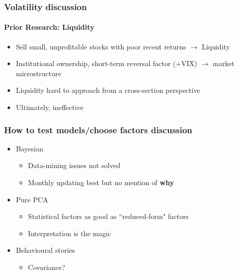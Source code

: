\documentclass[notes]{beamer}  %
\begin{document}

\begin{frame} \frametitle{Volatility discussion} \framesubtitle{Prior Research: Liquidity}
  \begin{itemize}
    \item Sell small, unprofitable stocks with poor recent returns $\rightarrow$ Liquidity \parencite{nagel2005short, nagel2012evaporating}
    \item Institutional ownership, short-term reversal factor (+VIX) $\rightarrow$ market microstructure
    \item Liquidity hard to approach from a cross-section perspective
    \item Ultimately, ineffective \parencite{ang2006cross}
  \end{itemize}
\end{frame}

\begin{frame} \frametitle{How to test models/choose factors discussion}
  \begin{itemize}
    \item Bayesian \parencite{barillas2015comparing}
    \begin{itemize}
      \item Data-mining issues not solved
      \item Monthly updating best but no mention of \textbf{why}
    \end{itemize}
    \item Pure PCA \parencite{kozak2017interpreting}
    \begin{itemize}
      \item Statistical factors as good as ``reduced-form" factors
      \item Interpretation is the magic
    \end{itemize}
    \item Behavioural stories
    \begin{itemize}
      \item Covariance? \parencite{cochrane2011presidential}
    \end{itemize}
  \end{itemize}
\end{frame}
\end{document}

